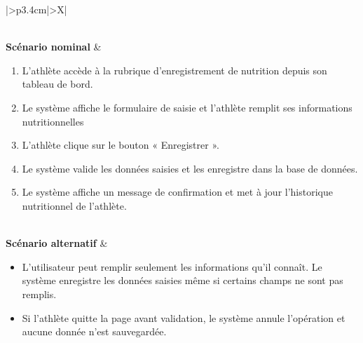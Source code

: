 ﻿\documentclass[a4paper,12pt]{report}
\begin{document}
\begin{table}[H]
\begin{tabularx}{\textwidth}{|>{\RaggedRight\arraybackslash}p{3.4cm}|>{\RaggedRight\arraybackslash}X|}
\begin{minipage}[t]{\linewidth}
\end{minipage} \\
\hline
\textbf{Scénario nominal} &
\begin{minipage}[t]{\linewidth}
\vspace{2pt}
\begin{enumerate}[label=\arabic*., leftmargin=*, topsep=0pt, itemsep=1pt]
    \item L'athlète accède à la rubrique d'enregistrement de nutrition depuis son tableau de bord.
    \item Le système affiche le formulaire de saisie et l'athlète remplit ses informations nutritionnelles 
    \item L'athlète clique sur le bouton « Enregistrer ».
    \item Le système valide les données saisies et les enregistre dans la base de données.
    \item Le système affiche un message de confirmation et met à jour l'historique nutritionnel de l'athlète.
\end{enumerate}
\vspace{2pt}
\end{minipage} \\
\hline
\textbf{Scénario alternatif} &
\begin{minipage}[t]{\linewidth}
\vspace{2pt}
\begin{itemize}[leftmargin=*, topsep=0pt, itemsep=1pt]
   \item  L'utilisateur peut remplir seulement les informations qu'il connaît. Le système enregistre les données saisies même si certains champs ne sont pas remplis.
    \item  Si l'athlète quitte la page avant validation, le système annule l'opération et aucune donnée n'est sauvegardée.
\end{itemize}
\vspace{2pt}
\end{minipage} \\
\hline
\end{tabularx}
\fussy
\end{table}
\end{document}
